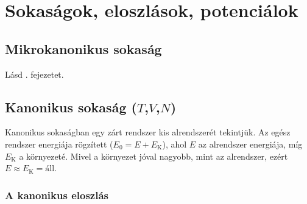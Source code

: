 \chapter{Sokas\'agok, eloszl\'asok, potenci\'alok}
 
 \section{Mikrokanonikus sokaság}
  
  Lásd . fejezetet.
  
 \section{Kanonikus sokaság ($T$,$V$,$N$)}
  
  Kanonikus sokaságban egy zárt rendszer kis alrendszerét tekintjük. Az egész rendszer energiája rögzített ($E_0=E+E_\text{K}$), ahol $E$ az alrendszer energiája, míg $E_\text{K}$ a környezeté. Mivel a környezet jóval nagyobb, mint az alrendszer, ezért $E\approx E_\text{K}=\text{áll}$. 
  
  \subsection{A kanonikus eloszlás}
   
